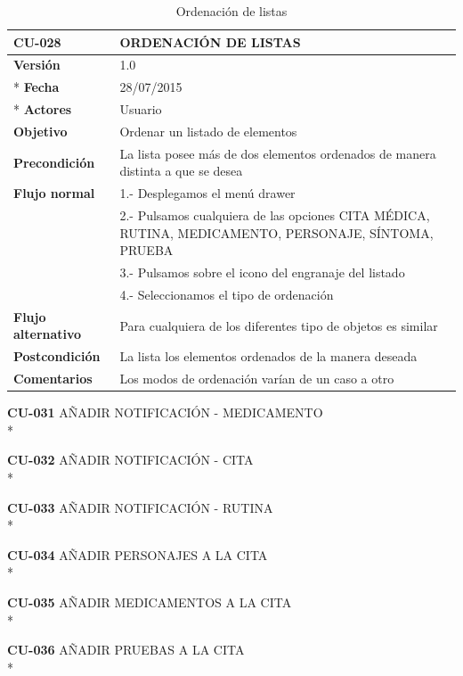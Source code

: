 \documentclass[../pfc.tex]{subfiles}
\begin{document}
		\begin{table}[H]
			\centering
			\begin{tabular}[t]{|p{3cm}|p{9.5cm}|}
				\hline \textbf{CU-028} & \textbf{ORDENACIÓN DE LISTAS} \\*
				\hline\hline \textbf{Versión} & 1.0 \\ *
				\hline\hline \textbf{Fecha} & 28/07/2015 \\ *
				\hline\textbf{Actores} 	& Usuario\\*
				\hline \textbf{Objetivo} & Ordenar un listado de elementos\\* 			
				\hline \textbf{Precondición} & La lista posee más de dos elementos ordenados de manera distinta a que se desea\\* 
				\hline \textbf{Flujo normal} & 1.- Desplegamos el menú drawer \\* 
				& 2.- Pulsamos cualquiera de las opciones CITA MÉDICA, RUTINA, MEDICAMENTO, PERSONAJE, SÍNTOMA, PRUEBA\\*	
				& 3.- Pulsamos sobre el icono del engranaje del listado\\*	
				& 4.- Seleccionamos el tipo de ordenación\\*	
				\hline \textbf{Flujo alternativo} & Para cualquiera de los diferentes tipo de objetos es similar \\* 
				\hline \textbf{Postcondición} & La lista los elementos ordenados de la manera deseada\\* 
				\hline \textbf{Comentarios}   & Los modos de ordenación varían de un caso a otro\\*
				\hline
			\end{tabular}
			\caption{Ordenación de listas}
			\label{tabla:caso030}
		\end{table}
		
			

	\textbf{CU-031}	AÑADIR NOTIFICACIÓN - MEDICAMENTO\\*
	
	\textbf{CU-032}	AÑADIR NOTIFICACIÓN - CITA\\*
	
	\textbf{CU-033}	AÑADIR NOTIFICACIÓN - RUTINA\\*
	
	\textbf{CU-034}	AÑADIR PERSONAJES A LA CITA\\*

	\textbf{CU-035}	AÑADIR MEDICAMENTOS A LA CITA\\*

	\textbf{CU-036}	AÑADIR PRUEBAS A LA CITA\\*
\end{document}
